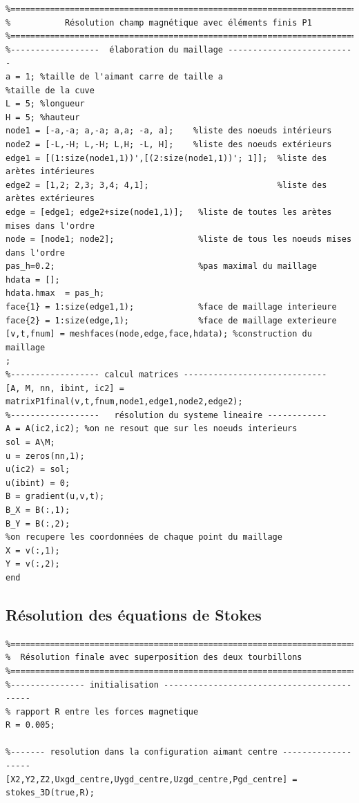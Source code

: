 \documentclass[a4paper,12pt,titlepage]{report}
\begin{document}
\begin{onehalfspace}
\begin{appendix}
\begin{verbatim}
%===========================================================================
%			Résolution champ magnétique avec éléments finis P1
%===========================================================================
%------------------  élaboration du maillage --------------------------
a = 1; %taille de l'aimant carre de taille a
%taille de la cuve
L = 5; %longueur
H = 5; %hauteur
node1 = [-a,-a; a,-a; a,a; -a, a];    %liste des noeuds intérieurs
node2 = [-L,-H; L,-H; L,H; -L, H];    %liste des noeuds extérieurs
edge1 = [(1:size(node1,1))',[(2:size(node1,1))'; 1]];  %liste des arètes intérieures
edge2 = [1,2; 2,3; 3,4; 4,1];                          %liste des arètes extérieures
edge = [edge1; edge2+size(node1,1)];   %liste de toutes les arètes mises dans l'ordre
node = [node1; node2];                 %liste de tous les noeuds mises dans l'ordre
pas_h=0.2;                             %pas maximal du maillage
hdata = [];
hdata.hmax  = pas_h;
face{1} = 1:size(edge1,1);             %face de maillage interieure
face{2} = 1:size(edge,1);              %face de maillage exterieure
[v,t,fnum] = meshfaces(node,edge,face,hdata); %construction du maillage
;
%------------------ calcul matrices -----------------------------
[A, M, nn, ibint, ic2] = matrixP1final(v,t,fnum,node1,edge1,node2,edge2);
%------------------   résolution du systeme lineaire ------------
A = A(ic2,ic2); %on ne resout que sur les noeuds interieurs
sol = A\M;
u = zeros(nn,1);
u(ic2) = sol;
u(ibint) = 0;  
B = gradient(u,v,t);
B_X = B(:,1);
B_Y = B(:,2);
%on recupere les coordonnées de chaque point du maillage
X = v(:,1);
Y = v(:,2);
end
\end{verbatim}


\subsection{Résolution des équations de Stokes}
\begin{verbatim}
%=========================================================================% 
%  Résolution finale avec superposition des deux tourbillons
%=========================================================================%
%--------------- initialisation -------------------------------------------
% rapport R entre les forces magnetique
R = 0.005;

%------- resolution dans la configuration aimant centre -------------------
[X2,Y2,Z2,Uxgd_centre,Uygd_centre,Uzgd_centre,Pgd_centre] = stokes_3D(true,R);



\end{verbatim}
\end{appendix}
\end{onehalfspace}
\end{document}
